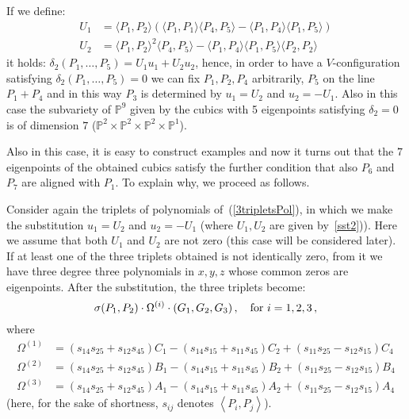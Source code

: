\documentclass[11pt, a4paper, reqno, captions=tableheading,bibliography=totoc]{scrartcl}
\theoremstyle{plain}
\theoremstyle{definition}
\newcommand{\scl}[2]{\left\langle {#1}, {#2} \right\rangle}
\begin{document}
If we define:
\begin{equation}
  \begin{split}
    U_1 & =  \langle P_1, P_2\rangle \left(\langle P_1, P_1\rangle
  \langle P_4,P_5\rangle - \langle P_1, P_4\rangle \langle P_1, P_5\rangle
  \right)\\
  U_2 & =  \langle P_1, P_2\rangle^2\langle P_4, P_5\rangle
  -\langle P_1, P_4\rangle \langle P_1, P_5\rangle \langle P_2, P_2\rangle
  \label{sst2}
  \end{split}
\end{equation}
it holds: $\delta_2(P_1, \dots, P_5) = U_1u_1+U_2u_2$, hence, in order to
have a $V$-configuration satisfying $\delta_2(P_1, \dots, P_5) = 0$ we can
fix $P_1, P_2, P_4$ arbitrarily, $P_5$ on the line $P_1+P_4$ and in this
way $P_3$ is determined by $u_1 = U_2$ and $u_2 = -U_1$. Also in this case
the subvariety of $\mathbb{P}^9$ given by the cubics with 5
eigenpoints satisfying $\delta_2 = 0$ is of dimension $7$
($\mathbb{P}^2\times \mathbb{P}^2 \times \mathbb{P}^2\times \mathbb{P}^1$).

Also in this case, it is easy to construct examples and now it turns out that
the $7$ eigenpoints of the obtained cubics satisfy the further
condition that also $P_6$ and  $P_7$ are aligned with $P_1$. To explain
why, we proceed as follows.

Consider again the
triplets of polynomials of~(\ref{3tripletsPol}), in which we make the
substitution $u_1 = U_2$ and $u_2 = -U_1$ (where $U_1, U_2$ are
given by~\ref{sst2})). Here we
assume that both $U_1$ and $U_2$ are not zero (this case will be considered
later). If at least one of the three triplets obtained is not identically
zero, from it we have three degree three polynomials in $x, y, z$ whose
common zeros are eigenpoints.
After the substitution, the three triplets become:
%
\begin{equation}
\sigma(P_1, P_2) \cdot \Omega^{(i)} \cdot  \left(G_1, G_2, G_3\right),\quad
\hbox{for } i = 1, 2, 3 \,,
\label{G1G2G3}
\end{equation}
%
where
%
\begin{equation}
\label{3_Omega}
  \begin{split}
  \Omega^{(1)} & = (s_{14} s_{25} + s_{12} s_{45}) C_{1}
- (s_{14}s_{15}+s_{11}s_{45})C_{2} +(s_{11} s_{25}- s_{12} s_{15})C_4 \\
  \Omega^{(2)} & = (s_{14} s_{25} + s_{12} s_{45}) B_{1}
- (s_{14} s_{15} + s_{11} s_{45}) B_{2} +(s_{11} s_{25} - s_{12} s_{15}) B_{4} \\
  \Omega^{(3)} & = (s_{14} s_{25} + s_{12} s_{45}) A_{1}
- (s_{14} s_{15} +s_{11} s_{45})A_{2} +(s_{11} s_{25}-s_{12} s_{15})A_{4}
\end{split}
\end{equation}
%
(here, for the sake of shortness, $s_{ij}$ denotes $\scl{P_i}{P_j}$).
\end{document}
